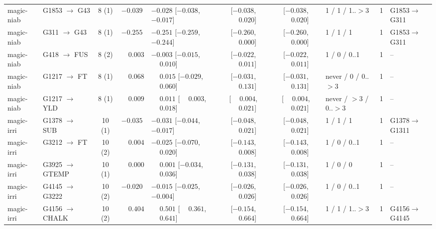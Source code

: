 \begin{landscape}
\begin{table}[p]
\begin{tabular}{@{}llccl cc l c l@{}}
magic-niab & G1853 $\to$ G43 & 8 (1) & $-0.039$ & $-0.028$ [$-0.038$, $-0.017$] & [$-0.038$, $\phantom{-}0.020$] & [$-0.038$, $\phantom{-}0.020$] & 1 / 1 / 1..$>$3 & 1 & G1853$\to$G311 \\
magic-niab & G311 $\to$ G43 & 8 (1) & $-0.255$ & $-0.251$ [$-0.259$, $-0.244$] & [$-0.260$, $\phantom{-}0.000$] & [$-0.260$, $\phantom{-}0.000$] & 1 / 1 / 1 & 1 & G1853$\to$G311 \\
magic-niab & G418 $\to$ FUS & 8 (2) & $\phantom{-}0.003$ & $-0.003$ [$-0.015$, $\phantom{-}0.010$] & [$-0.022$, $\phantom{-}0.011$] & [$-0.022$, $\phantom{-}0.011$] & 1 / 0 / 0..1 & 1 & -- \\
magic-niab & G1217 $\to$ FT & 8 (1) & $\phantom{-}0.068$ & $\phantom{-}0.015$ [$-0.029$, $\phantom{-}0.060$] & [$-0.031$, $\phantom{-}0.131$] & [$-0.031$, $\phantom{-}0.131$] & never / 0 / 0..$>$3 & 1 & -- \\
magic-niab & G1217 $\to$ YLD & 8 (1) & $\phantom{-}0.009$ & $\phantom{-}0.011$ [$\phantom{-}0.003$, $\phantom{-}0.018$] & [$\phantom{-}0.004$, $\phantom{-}0.021$] & [$\phantom{-}0.004$, $\phantom{-}0.021$] & never / $>$3 / 0..$>$3 & 1 & -- \\
magic-irri & G1378 $\to$ SUB & 10 (1) & $-0.035$ & $-0.031$ [$-0.044$, $-0.017$] & [$-0.048$, $\phantom{-}0.021$] & [$-0.048$, $\phantom{-}0.021$] & 1 / 1 / 1 & 1 & G1378$\to$G1311 \\
magic-irri & G3212 $\to$ FT & 10 (2) & $\phantom{-}0.004$ & $-0.025$ [$-0.070$, $\phantom{-}0.020$] & [$-0.143$, $\phantom{-}0.008$] & [$-0.143$, $\phantom{-}0.008$] & 1 / 0 / 0..1 & 1 & -- \\
magic-irri & G3925 $\to$ GTEMP & 10 (1) & $\phantom{-}0.000$ & $\phantom{-}0.001$ [$-0.034$, $\phantom{-}0.036$] & [$-0.131$, $\phantom{-}0.038$] & [$-0.131$, $\phantom{-}0.038$] & 1 / 0 / 0 & 1 & -- \\
magic-irri & G4145 $\to$ G3222 & 10 (2) & $-0.020$ & $-0.015$ [$-0.025$, $-0.004$] & [$-0.026$, $\phantom{-}0.026$] & [$-0.026$, $\phantom{-}0.026$] & 1 / 0 / 0..1 & 1 & -- \\
magic-irri & G4156 $\to$ CHALK & 10 (2) & $\phantom{-}0.404$ & $\phantom{-}0.501$ [$\phantom{-}0.361$, $\phantom{-}0.641$] & [$-0.154$, $\phantom{-}0.664$] & [$-0.154$, $\phantom{-}0.664$] & 1 / 1 / 1..$>$3 & 1 & G4156$\to$G4145 \\
\bottomrule
\end{tabular}
\end{table}
\end{landscape}
